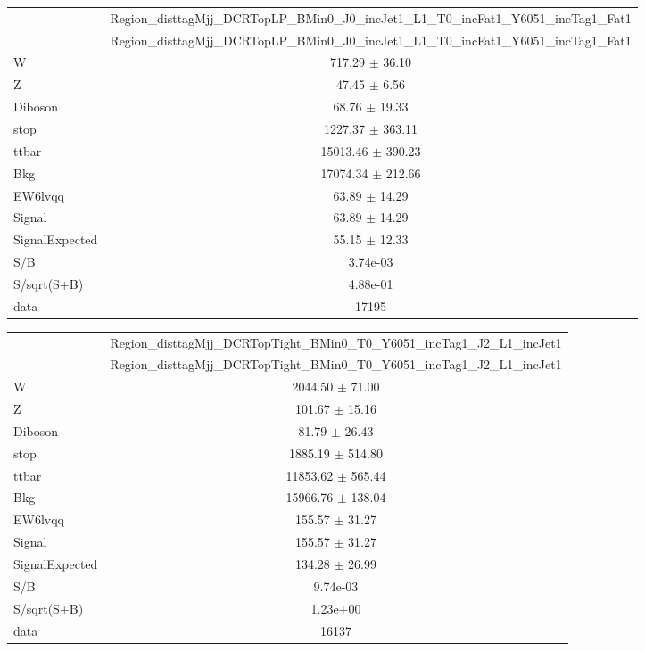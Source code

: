 \documentclass{article}
\begin{document}
\begin{table}
\centering
\small
\begin{tabular}{l|c|}
\cline{2-2}
 & \multicolumn{1}{c|}{Region\_disttagMjj\_DCRTopLP\_BMin0\_J0\_incJet1\_L1\_T0\_incFat1\_Y6051\_incTag1\_Fat1}\\
\cline{2-2}
 & \multicolumn{1}{c|}{Region\_disttagMjj\_DCRTopLP\_BMin0\_J0\_incJet1\_L1\_T0\_incFat1\_Y6051\_incTag1\_Fat1}\\ \hline
W & 717.29 $\pm$ 36.10\\
Z & 47.45 $\pm$ 6.56\\
Diboson & 68.76 $\pm$ 19.33\\
stop & 1227.37 $\pm$ 363.11\\
ttbar & 15013.46 $\pm$ 390.23\\
\hline
Bkg & 17074.34 $\pm$ 212.66\\
\hline
EW6lvqq & 63.89 $\pm$ 14.29\\
\hline
Signal & 63.89 $\pm$ 14.29\\
SignalExpected & 55.15 $\pm$ 12.33\\
\hline
S/B & 3.74e-03\\
S/sqrt(S+B) & 4.88e-01\\
\hline
data & 17195\\ \hline
\end{tabular}
\end{table}


\clearpage


\begin{table}
\centering
\small
\begin{tabular}{l|c|}
\cline{2-2}
 & \multicolumn{1}{c|}{Region\_disttagMjj\_DCRTopTight\_BMin0\_T0\_Y6051\_incTag1\_J2\_L1\_incJet1}\\
\cline{2-2}
 & \multicolumn{1}{c|}{Region\_disttagMjj\_DCRTopTight\_BMin0\_T0\_Y6051\_incTag1\_J2\_L1\_incJet1}\\ \hline
W & 2044.50 $\pm$ 71.00\\
Z & 101.67 $\pm$ 15.16\\
Diboson & 81.79 $\pm$ 26.43\\
stop & 1885.19 $\pm$ 514.80\\
ttbar & 11853.62 $\pm$ 565.44\\
\hline
Bkg & 15966.76 $\pm$ 138.04\\
\hline
EW6lvqq & 155.57 $\pm$ 31.27\\
\hline
Signal & 155.57 $\pm$ 31.27\\
SignalExpected & 134.28 $\pm$ 26.99\\
\hline
S/B & 9.74e-03\\
S/sqrt(S+B) & 1.23e+00\\
\hline
data & 16137\\ \hline
\end{tabular}
\end{table}
\end{document}
